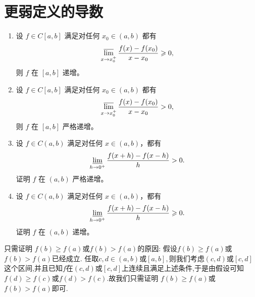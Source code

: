 \documentclass[../../main.tex]{subfiles}
\begin{document}
\section{更弱定义的导数}

\begin{theorem}[最弱递增条件]\label{theorem:最弱递增条件}
\begin{enumerate}
\item 设 \(f\in C[a,b]\) 满足对任何 \(x_0\in (a,b)\) 都有
\begin{align*}
\varlimsup_{x\rightarrow x_0^+}\frac{f(x)-f(x_0)}{x - x_0}\geqslant 0,
\end{align*}
则 \(f\) 在 \([a,b]\) 递增。

\item 设 \(f\in C[a,b]\) 满足对任何 \(x_0\in (a,b)\) 都有
\begin{align}
\varlimsup_{x\rightarrow x_0^+}\frac{f(x)-f(x_0)}{x - x_0}> 0,\label{equation--13.100}
\end{align}
则 \(f\) 在 \([a,b]\) 严格递增。

\item 设 \(f\in C(a,b)\) 满足对任何 \(x\in (a,b)\)，都有
\begin{align*}
\varliminf_{h\rightarrow 0^+}\frac{f(x + h)-f(x - h)}{h}> 0.
\end{align*}
证明 \(f\) 在 \((a,b)\) 严格递增。

\item 设 \(f\in C(a,b)\) 满足对任何 \(x\in (a,b)\)，都有
\begin{align*}
\varliminf_{h\rightarrow 0^+}\frac{f(x + h)-f(x - h)}{h}\geqslant 0.
\end{align*}
证明 \(f\) 在 \((a,b)\) 递增。 
\end{enumerate}
\end{theorem}
\begin{remark}
只需证明 \(f(b) \geq f(a)\)或\(f(b)>f(a)\)的原因:
假设\(f(b) \geq f(a)\)或\(f(b)>f(a)\)已经成立.
任取$c,d\in (a,b)$或$[a,b],$则我们考虑$(c,d)$或$[c,d]$这个区间,并且已知$f$在$(c,d)$或$[c,d]$上连续且满足上述条件,于是由假设可知\(f(d) \geq f(c)\)或\(f(d)>f(c)\).故我们只需证明 \(f(b) \geq f(a)\)或\(f(b)>f(a)\)即可.
\end{remark}
\end{document}
